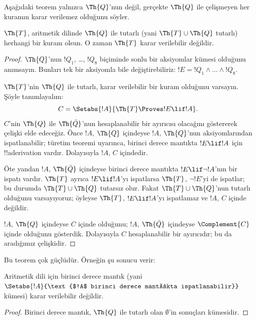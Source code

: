 



Aşağıdaki teorem yalnızca $\Th{Q}$'nun değil, gerçekte $\Th{Q}$ ile
çelişmeyen her kuramın karar verilemez olduğunu söyler.

\begin{thm}
$\Th{T}$, aritmetik dilinde $\Th{Q}$ ile tutarlı (yani
$\Th{T} \cup \Th{Q}$ tutarlı) herhangi bir kuram olsun. O zaman $\Th{T}$
karar verilebilir değildir.
\end{thm}

\begin{proof}
$\Th{Q}$'nun $!Q_1$, \dots, $!Q_8$ biçiminde sonlu bir aksiyomlar kümesi
olduğunu anımsayın. Bunları tek bir aksiyomla bile değiştirebiliriz:
$!E = !Q_1 \land \dots \land !Q_8$.

$\Th{T}$'nin $\Th{Q}$ ile tutarlı, karar verilebilir bir kuram olduğunu
varsayın. Şöyle tanımlayalım:
\[
C = \Setabs{!A}{\Th{T} \Proves !E \lif !A}.
\]
$C$'nin $\Th{Q}$ ile $\Th{\bar Q}$'nun hesaplanabilir bir ayırıcısı olacağını
göstererek çelişki elde edeceğiz. Önce $!A$, $\Th{Q}$ içindeyse $!A$,
$\Th{Q}$'nun aksiyomlarından ispatlanabilir; türetim teoremi uyarınca,
birinci derece mantıkta $!E \lif !A$ için !!a{derivation} vardır. Dolayısıyla
$!A$, $C$ içindedir.

Öte yandan $!A$, $\Th{\bar Q}$ içindeyse birinci derece mantıkta
$!E \lif \lnot !A$'nın bir ispatı vardır. $\Th{T}$ ayrıca
$!E \lif !A$'yı ispatlarsa $\Th{T}$, $\lnot !E$'yi de ispatlar; bu durumda
$\Th{T} \cup \Th{Q}$ tutarsız olur. Fakat $\Th{T} \cup \Th{Q}$'nun tutarlı
olduğunu varsayıyoruz; öyleyse $\Th{T}$, $!E \lif !A$'yı ispatlamaz ve
$!A$, $C$ içinde değildir.

$!A$, $\Th{Q}$ içindeyse $C$ içinde olduğunu; $!A$, $\Th{\bar Q}$ içindeyse
$\Complement{C}$ içinde olduğunu gösterdik. Dolayısıyla $C$ hesaplanabilir
bir ayırıcıdır; bu da aradığımız çelişkidir.
\end{proof}

Bu teorem çok güçlüdür. Örneğin şu sonucu verir:

\begin{cor}
  Aritmetik dili için birinci derece mantık (yani
  $\Setabs{!A}{\text{$!A$ birinci derece mantıkta ispatlanabilir}}$ kümesi)
  karar verilebilir değildir.
\end{cor}

\begin{proof}
Birinci derece mantık, $\Th{Q}$ ile tutarlı olan $\emptyset$'in sonuçları
kümesidir.
\end{proof}

